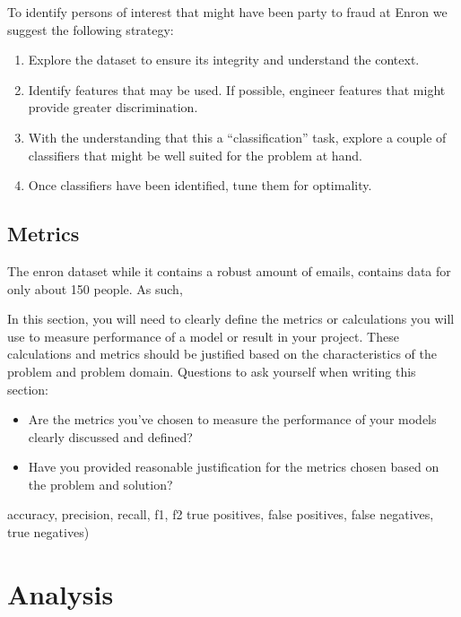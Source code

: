\documentclass[twoside,openright,titlepage,numbers=noenddot,headinclude,%
               footinclude=true,cleardoublepage=empty,abstractoff,BCOR=5mm,%
               paper=a4,fontsize=11pt,ngerman,american]{scrreprt}
\numberwithin{theorem}{chapter}
\numberwithin{definition}{chapter}
\numberwithin{algorithm}{chapter}
\numberwithin{figure}{chapter}
\numberwithin{table}{chapter}
\numberwithin{equation}{chapter}
\begin{document}
To identify persons of interest that might have been party to fraud at Enron we suggest the following strategy:
\begin{enumerate}%
\item Explore the dataset to ensure its integrity and understand the context.
\item Identify features that may be used. If possible, engineer features that might provide greater discrimination.
\item With the understanding that this a ``classification'' task, explore a couple of classifiers that might be well suited for the problem at hand.
\item Once classifiers have been identified, tune them for optimality.
\end{enumerate}



\section*{Metrics}

The enron dataset while it contains a robust amount of emails, contains data for only about 150 people. As such, 

In this section, you will need to clearly define the metrics or calculations you will use to measure performance of a model or result in your project. These calculations and metrics should be justified based on the characteristics of the problem and problem domain. Questions to ask yourself when writing this section:
\begin{itemize}%
\item Are the metrics you've chosen to measure the performance of your models clearly discussed and defined?
\item Have you provided reasonable justification for the metrics chosen based on the problem and solution?
\end{itemize}

accuracy, precision, recall, f1, f2
true positives, false positives, false negatives, true negatives)


\chapter*{Analysis}
\end{document}
